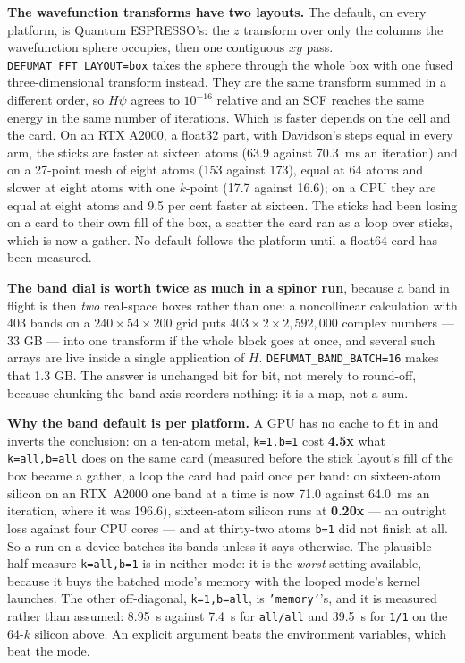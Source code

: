 \documentclass[11pt,a4paper]{article}
\newcommand{\qe}{Quantum ESPRESSO}
\newcommand{\code}[1]{\texttt{\small #1}}
\begin{document}
\textbf{The wavefunction transforms have two layouts.} The default, on every
platform, is \qe's: the $z$ transform over only the columns the wavefunction
sphere occupies, then one contiguous $xy$ pass.
\code{DEFUMAT\_FFT\_LAYOUT=box} takes the sphere through the whole box with one
fused three-dimensional transform instead. They are the same transform summed in
a different order, so $H\psi$ agrees to $10^{-16}$ relative and an SCF reaches the
same energy in the same number of iterations. Which is faster depends on the cell
and the card. On an RTX A2000, a float32 part, with Davidson's steps equal in every
arm, the sticks are faster at sixteen atoms (63.9 against 70.3~ms an iteration) and
on a 27-point mesh of eight atoms (153 against 173), equal at 64 atoms and slower at
eight atoms with one $k$-point (17.7 against 16.6); on a CPU they are equal at eight
atoms and 9.5 per cent faster at sixteen. The sticks had been losing on a card to
their own fill of the box, a scatter the card ran as a loop over sticks, which is
now a gather. No default follows the platform until a float64 card has been
measured.

\textbf{The band dial is worth twice as much in a spinor run}, because a band
in flight is then \emph{two} real-space boxes rather than one: a noncollinear
calculation with 403 bands on a $240\times54\times200$ grid puts
$403\times2\times2{,}592{,}000$ complex numbers --- 33 GB --- into one transform
if the whole block goes at once, and several such arrays are live inside a
single application of $H$. \code{DEFUMAT\_BAND\_BATCH=16} makes that 1.3 GB. The
answer is unchanged bit for bit, not merely to round-off, because chunking the
band axis reorders nothing: it is a map, not a sum.

\textbf{Why the band default is per platform.} A GPU has no cache to fit in and
inverts the conclusion: on a ten-atom metal, \code{k=1,b=1} cost \textbf{4.5x}
what \code{k=all,b=all} does on the same card (measured before the stick layout's
fill of the box became a gather, a loop the card had paid once per band: on
sixteen-atom silicon on an RTX~A2000 one band at a time is now 71.0 against
64.0~ms an iteration, where it was 196.6), sixteen-atom silicon runs at
\textbf{0.20x} --- an outright loss against four CPU cores --- and at
thirty-two atoms \code{b=1} did not finish at all. So a run on a device batches
its bands unless it says otherwise. The plausible half-measure
\code{k=all,b=1} is in neither mode: it is the \emph{worst} setting available,
because it buys the batched mode's memory with the looped mode's kernel
launches. The other off-diagonal, \code{k=1,b=all}, is \code{'memory'}'s, and
it is measured rather than assumed: 8.95~s against 7.4~s for \code{all/all} and
39.5~s for \code{1/1} on the 64-$k$ silicon above. An explicit argument beats
the environment variables, which beat the mode.
\end{document}
